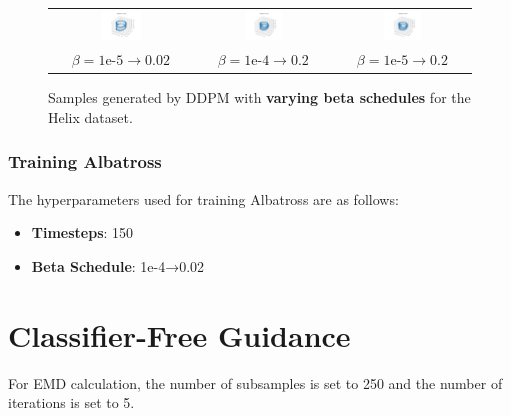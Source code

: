 \documentclass[11pt]{article}
\begin{document}
\begin{figure}[H]
\begin{tabular}{ccc}
            \includegraphics[width=0.3\textwidth]{exps/ddpm_3_200_1e-05_0.02_helix/samples_200.png} &
            \includegraphics[width=0.3\textwidth]{exps/ddpm_3_200_0.0001_0.2_helix/samples_200.png} &
            \includegraphics[width=0.3\textwidth]{exps/ddpm_3_200_1e-05_0.2_helix/samples_200.png} \\
            $\beta=1\text{e-}5\to0.02$ & $\beta=1\text{e-}4\to0.2$ & $\beta=1\text{e-}5\to0.2$ \\
        \end{tabular}
        \caption{Samples generated by DDPM with \textbf{varying beta schedules} for the Helix dataset.}
        \label{fig:beta_helix}
    \end{figure}

\subsubsection{Training Albatross}
The hyperparameters used for training Albatross are as follows:
\begin{itemize}
    \item \textbf{Timesteps}: 150
    \item \textbf{Beta Schedule}: 1e-4→0.02
\end{itemize}

\section{Classifier-Free Guidance}

For EMD calculation, the number of subsamples is set to 250 and the number of iterations is set to 5.
\end{document}

